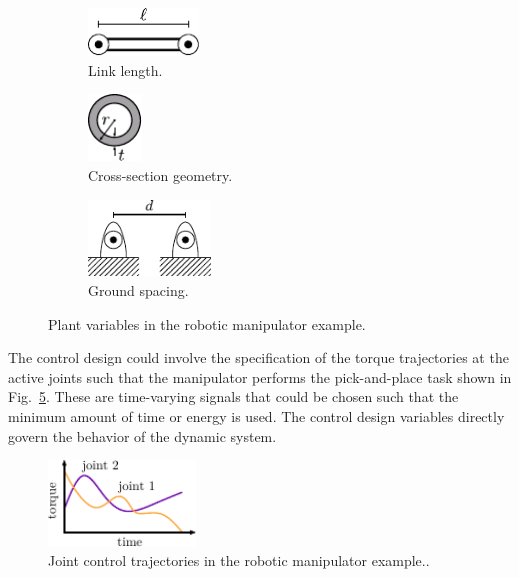 \begin{figure}
\centering
\begin{subfigure}[b]{0.33\textwidth}
\centering
	\includegraphics[height=0.5in]{../ch1/figures/robotplant_a.pdf}
    \caption{Link length.\label{fig:ch1:robotplant_a}}
\end{subfigure}%
\begin{subfigure}[b]{0.33\textwidth}
\centering
	\includegraphics[height=0.7in]{../ch1/figures/robotplant_b.pdf}
    \caption{Cross-section geometry.\label{fig:ch1:robotplant_b}}
\end{subfigure}%
\begin{subfigure}[b]{0.33\textwidth}
\centering
	\includegraphics[height=0.8in]{../ch1/figures/robotplant_c.pdf}
    \caption{Ground spacing.\label{fig:ch1:robotplant_c}}
\end{subfigure}%
\caption{Plant variables in the robotic manipulator example.\label{fig:ch1:robotplant}}
\end{figure}

The control design could involve the specification of the torque trajectories at the active joints such that the manipulator performs the pick-and-place task shown in Fig.~\ref{fig:ch1:robotcontrol_b}.
These are time-varying signals that could be chosen such that the minimum amount of time or energy is used.
The control design variables directly govern the behavior of the dynamic system.

\begin{figure}
\centering
	\includegraphics[width=0.35\textwidth]{../ch1/figures/robotcontrol_b.pdf}
    \caption{Joint control trajectories in the robotic manipulator example..\label{fig:ch1:robotcontrol_b}}
\end{figure}

